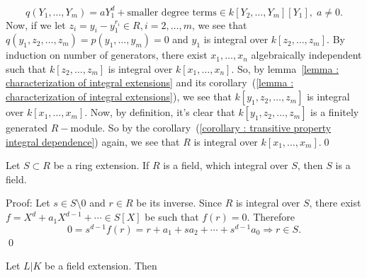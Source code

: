 \begin{equation}
    q(Y_1,\dots,Y_m) = aY_1^d + \text{smaller degree terms} \in k[Y_2,\dots, Y_m][Y_1],\;a\neq0.
\end{equation}
Now, if we let $z_i=y_i - y_1^{r_i}\in R,i=2,\dots,m$, we see that $q(y_1,z_2,\dots,z_m)=p(y_1,\dots,y_m)=0$ and 
$y_1$ is integral over $k[z_2,\dots, z_m]$. By induction on number of generators, there exist $x_1,\dots, x_n$
algebraically independent such that $k[z_2,\dots, z_m]$ is integral over $k[x_1,\dots, x_n]$. So, by lemma~\ref{lemma : characterization of integral extensions}
and its corollary~(\ref{lemma : characterization of integral extensions}), we see that $k[y_1,z_2,\dots,z_m]$ is integral over $k[x_1,\dots,x_m]$. Now, by definition, it's clear 
that $k[y_1,z_2,\dots,z_m]$ is a finitely generated $R-$module. So by the corollary~(\ref{corollary : transitive property integral dependence}) again, we 
see that $R$ is integral over $k[x_1,\dots,x_m]$.\qed 

\begin{dang}
    \begin{lemma}\label{lemma : R is a field, S is a field}
        Let $S\subset R$ be a ring extension. If $R$ is a field, which integral over $S$, then $S$ is a field. 
    \end{lemma}
\end{dang}
Proof: Let $s\in S\setminus0$ and $r\in R$ be its inverse. Since $R$ is integral over $S$, there exist
$f=X^d+a_1X^{d-1}+\cdots\in S[X]$ be such that $f(r)=0$. Therefore 
\begin{equation}
   0= s^{d-1}f(r) = r + a_1 + sa_2+\cdots + s^{d-1}a_0\Rightarrow r\in S.
\end{equation} 
\qed

\begin{remark}
    Let $L|K$ be a field extension. Then
    \begin{center}
    \end{center}
\end{remark}


